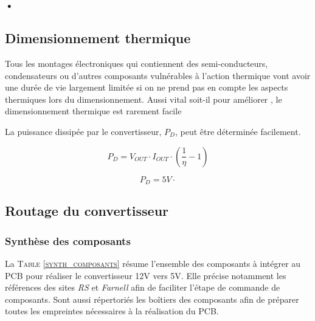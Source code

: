\documentclass[a4paper,12pt]{book}
\begin{document}
				\subsubsection{•}
				
			
			\subsection{Dimensionnement thermique}
			
			Tous les montages électroniques qui contiennent des semi-conducteurs, condensateurs ou d'autres composants vulnérables à l'action thermique vont avoir une durée de vie largement limitée si on ne prend pas en compte les aspects thermiques lors du dimensionnement. Aussi vital soit-il pour améliorer , le dimensionnement thermique est rarement facile 	
			
			La puissance dissipée par le convertisseur, $P_D$, peut être déterminée facilement.
			
			\begin{equation}
				P_D = V_{OUT}\cdot I_{OUT}\cdot\left(\frac{1}{\eta}-1\right)
			\end{equation}	
			
			\begin{equation}
				P_D  = 5V\cdot
			\end{equation}							
			
			
			
			\subsection{Routage du convertisseur}
			
				\subsubsection{Synthèse des composants}
				
				La \textsc{Table \ref{synth_composants}} résume l'ensemble des composants à intégrer au PCB pour réaliser le convertisseur 12V vers 5V. Elle précise notamment les références des sites \textit{RS} et \textit{Farnell} afin de faciliter l'étape de commande de composants. Sont aussi répertoriés les boîtiers des composants afin de préparer toutes les empreintes nécessaires à la réalisation du PCB.
				
\end{document}
